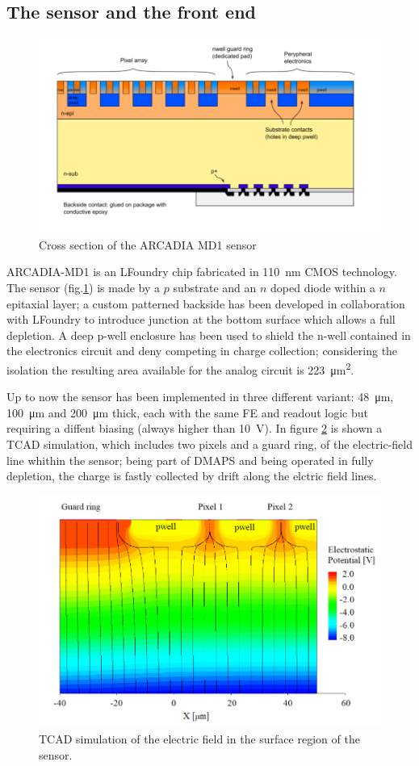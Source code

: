 \subsection{The sensor and the front end}
    \begin{figure}[h!]
        \centering
        \includegraphics[width=.8\linewidth]{figures/ARCADIA/sensor.png}
        \caption{Cross section of the ARCADIA MD1 sensor}
        \label{fig:ARCADIA_substrate}
    \end{figure}
    ARCADIA-MD1 is an LFoundry chip fabricated in \SI{110}{nm} CMOS technology.%
    The sensor (fig.\ref{fig:ARCADIA_substrate}) is made by a $p$ substrate and an $n$ doped diode within a $n$ epitaxial layer; a custom patterned backside has been developed in collaboration with LFoundry to introduce junction at the bottom surface which allows a full depletion. 
    A deep p-well enclosure has been used to shield the n-well contained in the electronics circuit and deny competing in charge collection; considering the isolation the resulting area available for the analog circuit is \SI{223}{\um\squared}.

    Up to now the sensor has been implemented in three different variant: \SI{48}{\um}, \SI{100}{\um} and \SI{200}{\um} thick, each with the same FE and readout logic but requiring a diffent biasing (always higher than \SI{10}{V}). 
    In figure \ref{fig:ARCADIA_E} is shown a TCAD simulation, which includes two pixels and a guard ring, of the electric-field line whithin the sensor; being part of DMAPS and being operated in fully depletion, the charge is fastly collected by drift along the elctric field lines. 
    \begin{figure}[h!]
        \centering
        \includegraphics[width=.8\linewidth]{figures/ARCADIA/ARCADIA_TCAD.png}
        \caption{TCAD simulation of the electric field in the surface region of the sensor.}
        \label{fig:ARCADIA_E}
    \end{figure}

